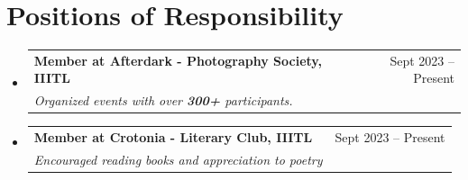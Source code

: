 \documentclass[a4paper,20pt]{article}
\makeatletter
\newcommand{\resumeSubheading}[4]{
  \vspace{-1pt}\item
    \begin{tabular*}{0.97\textwidth}{l@{\extracolsep{\fill}}r}
      \textbf{#1} & #2 \\
      \textit{#3} & \textit{#4} \\
    \end{tabular*}\vspace{-5pt}
}
\newcommand{\resumeSubHeadingListStart}{\begin{itemize}[leftmargin=*]}
\newcommand{\resumeSubHeadingListEnd}{\end{itemize}}
\makeatother
\begin{document}
\section{Positions of Responsibility}
\resumeSubHeadingListStart
\resumeSubheading
  {Member at Afterdark - Photography Society, IIITL}{Sept 2023 -- Present}
  {Organized events with over \textbf{300+} participants.}{}
\resumeSubheading
  {Member at Crotonia - Literary Club, IIITL}{Sept 2023 -- Present}
  {Encouraged reading books and appreciation to poetry}{}
\resumeSubHeadingListEnd
 
\end{document}
